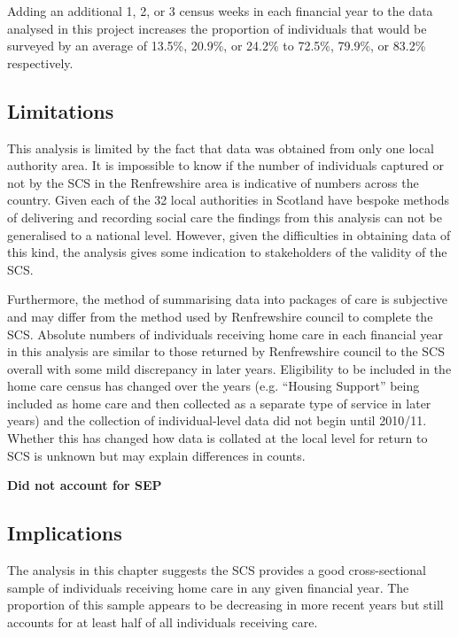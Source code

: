 \documentclass[]{article}
\begin{document}
Adding an additional 1, 2, or 3 census weeks in each financial year to
the data analysed in this project increases the proportion of
individuals that would be surveyed by an average of 13.5\%, 20.9\%, or
24.2\% to 72.5\%, 79.9\%, or 83.2\% respectively.

\subsection{Limitations}\label{subsec:renf-discuss-lim}

This analysis is limited by the fact that data was obtained from only
one local authority area. It is impossible to know if the number of
individuals captured or not by the SCS in the Renfrewshire area is
indicative of numbers across the country. Given each of the 32 local
authorities in Scotland have bespoke methods of delivering and recording
social care the findings from this analysis can not be generalised to a
national level. However, given the difficulties in obtaining data of
this kind, the analysis gives some indication to stakeholders of the
validity of the SCS.

Furthermore, the method of summarising data into packages of care is
subjective and may differ from the method used by Renfrewshire council
to complete the SCS. Absolute numbers of individuals receiving home care
in each financial year in this analysis are similar to those returned by
Renfrewshire council to the SCS overall with some mild discrepancy in
later years. Eligibility to be included in the home care census has
changed over the years (e.g. ``Housing Support'' being included as home
care and then collected as a separate type of service in later years)
and the collection of individual-level data did not begin until 2010/11.
Whether this has changed how data is collated at the local level for
return to SCS is unknown but may explain differences in counts.

\textbf{Did not account for SEP}

\subsection{Implications}\label{subsec:renf-discuss-imp}

The analysis in this chapter suggests the SCS provides a good
cross-sectional sample of individuals receiving home care in any given
financial year. The proportion of this sample appears to be decreasing
in more recent years but still accounts for at least half of all
individuals receiving care.
\end{document}
